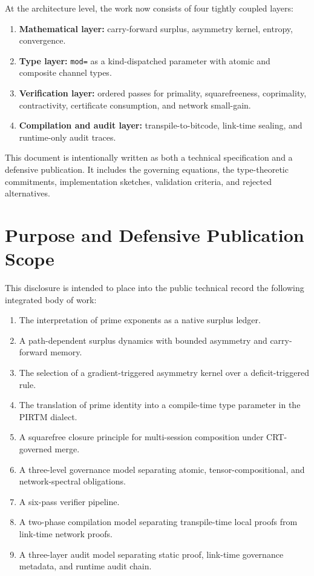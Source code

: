 \documentclass[11pt]{article}
\begin{document}
At the architecture level, the work now consists of four tightly coupled layers:
\begin{enumerate}[leftmargin=2em]
  \item \textbf{Mathematical layer:} carry-forward surplus, asymmetry kernel, entropy, convergence.
  \item \textbf{Type layer:} \texttt{mod=} as a kind-dispatched parameter with atomic and composite channel types.
  \item \textbf{Verification layer:} ordered passes for primality, squarefreeness, coprimality, contractivity, certificate consumption, and network small-gain.
  \item \textbf{Compilation and audit layer:} transpile-to-bitcode, link-time sealing, and runtime-only audit traces.
\end{enumerate}

This document is intentionally written as both a technical specification and a defensive publication. It includes the governing equations, the type-theoretic commitments, implementation sketches, validation criteria, and rejected alternatives.

\section{Purpose and Defensive Publication Scope}

This disclosure is intended to place into the public technical record the following integrated body of work:

\begin{enumerate}[leftmargin=2em]
  \item The interpretation of prime exponents as a native surplus ledger.
  \item A path-dependent surplus dynamics with bounded asymmetry and carry-forward memory.
  \item The selection of a gradient-triggered asymmetry kernel over a deficit-triggered rule.
  \item The translation of prime identity into a compile-time type parameter in the PIRTM dialect.
  \item A squarefree closure principle for multi-session composition under CRT-governed merge.
  \item A three-level governance model separating atomic, tensor-compositional, and network-spectral obligations.
  \item A six-pass verifier pipeline.
  \item A two-phase compilation model separating transpile-time local proofs from link-time network proofs.
  \item A three-layer audit model separating static proof, link-time governance metadata, and runtime audit chain.
\end{enumerate}
\end{document}
